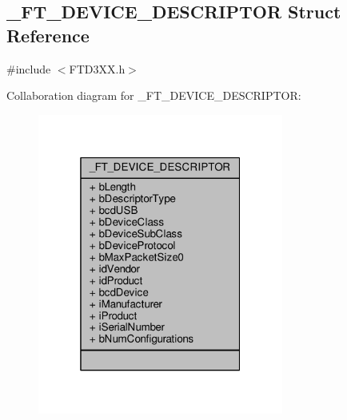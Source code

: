 \subsection{\+\_\+\+F\+T\+\_\+\+D\+E\+V\+I\+C\+E\+\_\+\+D\+E\+S\+C\+R\+I\+P\+T\+OR Struct Reference}
\label{struct__FT__DEVICE__DESCRIPTOR}


{\ttfamily \#include $<$F\+T\+D3\+X\+X.\+h$>$}



Collaboration diagram for \+\_\+\+F\+T\+\_\+\+D\+E\+V\+I\+C\+E\+\_\+\+D\+E\+S\+C\+R\+I\+P\+T\+OR\+:
\nopagebreak
\begin{figure}[H]
\begin{center}
\leavevmode
\includegraphics[width=229pt]{d1/d13/struct__FT__DEVICE__DESCRIPTOR__coll__graph}
\end{center}
\end{figure}
